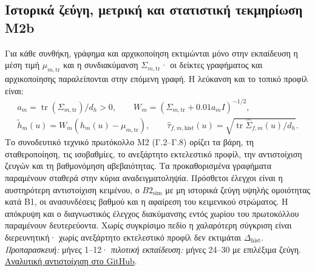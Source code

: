 \documentclass[a4paper]{article}
\newcommand{\dhist}{\ensuremath{\Delta_{\mathrm{hist}}}}
\begin{document}
\subsection{Ιστορικά ζεύγη, μετρική και στατιστική τεκμηρίωση Μ2b}\label{app:histprotocol}
Για κάθε συνθήκη, γράφημα και αρχικοποίηση εκτιμώνται μόνο στην εκπαίδευση η μέση τιμή $\mu_{m,\mathrm{tr}}$ και η συνδιακύμανση $\Sigma_{m,\mathrm{tr}}$· οι δείκτες γραφήματος και αρχικοποίησης παραλείπονται στην επόμενη γραφή. Η λεύκανση και το τοπικό προφίλ είναι:
\[
\begin{gathered}
a_m=\operatorname{tr}(\Sigma_{m,\mathrm{tr}})/d_h>0,\qquad
W_m=(\Sigma_{m,\mathrm{tr}}+0.01a_m I)^{-1/2},\\
\widetilde h_m(u)=W_m(h_m(u)-\mu_{m,\mathrm{tr}}),\qquad
\widehat\tau_{f,m,\mathrm{hist}}(u)=
\sqrt{\operatorname{tr}\widehat\Sigma_{f,m}(u)/d_h}.
\end{gathered}
\]
Το συνοδευτικό τεχνικό πρωτόκολλο Μ2 (Γ.2--Γ.8) ορίζει τα βάρη, τη σταθεροποίηση, τις ισοβαθμίες, το ανεξάρτητο εκτελεστικό προφίλ, την αντιστοίχιση ζευγών και τη βαθμονόμηση αβεβαιότητας. Τα προκαθορισμένα γραφήματα παραμένουν σταθερά στην κύρια αναδειγματοληψία. Πρόσθετοι έλεγχοι είναι η αυστηρότερη αντιστοίχιση κειμένου, ο $B2_{\mathrm{sim}}$ με μη ιστορικά ζεύγη υψηλής ομοιότητας κατά B1, οι ανασυνδέσεις βαθμού και η αφαίρεση του κειμενικού στρώματος. Η απόκρυψη και ο διαγνωστικός έλεγχος διακύμανσης εντός χωρίου του πρωτοκόλλου παραμένουν δευτερεύοντα. Χωρίς συγκρίσιμο πεδίο η χαλαρότερη σύγκριση είναι διερευνητική· χωρίς ανεξάρτητο εκτελεστικό προφίλ δεν εκτιμάται $\dhist$. \textit{Προπαρασκευή:} μήνες 1--12· \textit{πιλοτική εκπαίδευση:} μήνες 24--30 με επιλέξιμα ζεύγη. \href{https://github.com/GeorgeSpy/byz-position-phd-study/blob/main/docs/appendices/f.md#r159}{Αναλυτική αντιστοίχιση στο GitHub}.
\end{document}
